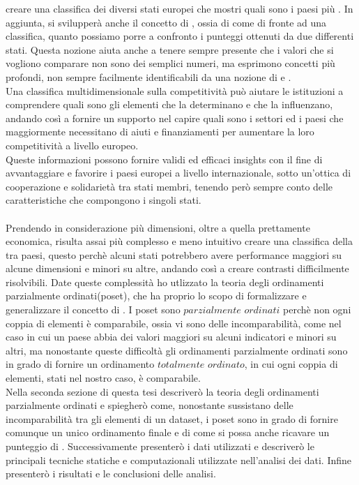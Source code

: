 \documentclass[a4paper,12pt, openright]{report}
\begin{document}
creare una classifica dei diversi stati europei che mostri quali sono i paesi più . In aggiunta, si svilupperà anche il concetto di , ossia di come di fronte ad una classifica, quanto possiamo porre a confronto i punteggi ottenuti 
da due differenti stati. Questa nozione aiuta anche a tenere sempre presente che i valori che si vogliono comparare non sono dei semplici numeri, ma esprimono 
concetti più profondi, non sempre facilmente identificabili da una nozione di  e .\\
Una classifica multidimensionale sulla competitività può aiutare le istituzioni a comprendere quali sono gli elementi che la determinano e 
che la influenzano, andando così a fornire un supporto nel capire quali sono i settori ed i paesi che maggiormente necessitano di 
aiuti e finanziamenti per aumentare la loro competitività a livello europeo. \\
Queste informazioni possono fornire validi ed efficaci insights con il fine di avvantaggiare e favorire i paesi europei a livello 
internazionale, sotto un'ottica di cooperazione e solidarietà tra stati membri, tenendo però sempre conto delle caratteristiche che compongono i singoli stati.\\
\\
Prendendo in considerazione più dimensioni, oltre a quella prettamente economica, risulta assai più complesso e meno intuitivo creare
una classifica della  tra paesi, questo perchè alcuni stati potrebbero avere performance maggiori su alcune dimensioni e minori 
su altre, andando così a creare contrasti difficilmente risolvibili. Date queste complessità ho utlizzato la teoria degli ordinamenti parzialmente ordinati(poset), che ha proprio lo scopo di formalizzare e 
generalizzare il concetto di . I poset sono $\textit{parzialmente ordinati}$ perchè non ogni coppia di elementi è 
comparabile, ossia vi sono delle incomparabilità, come nel caso in cui un paese abbia dei valori maggiori su alcuni indicatori e minori 
su altri, ma nonostante queste difficoltà gli ordinamenti parzialmente ordinati sono in grado di fornire un ordinamento
$\textit{totalmente ordinato}$, in cui ogni coppia di elementi, stati nel nostro caso, è comparabile. \\
Nella seconda sezione di questa tesi descriverò la teoria degli ordinamenti parzialmente ordinati e spiegherò come, nonostante 
sussistano delle incomparabilità tra gli elementi di un dataset, i poset sono in grado di fornire comunque un unico ordinamento finale e di come si possa anche 
ricavare un punteggio di . Successivamente 
presenterò i dati utilizzati e descriverò le principali tecniche statiche e computazionali utilizzate nell'analisi dei dati. Infine 
presenterò i risultati e le conclusioni delle analisi. 
\end{document}

